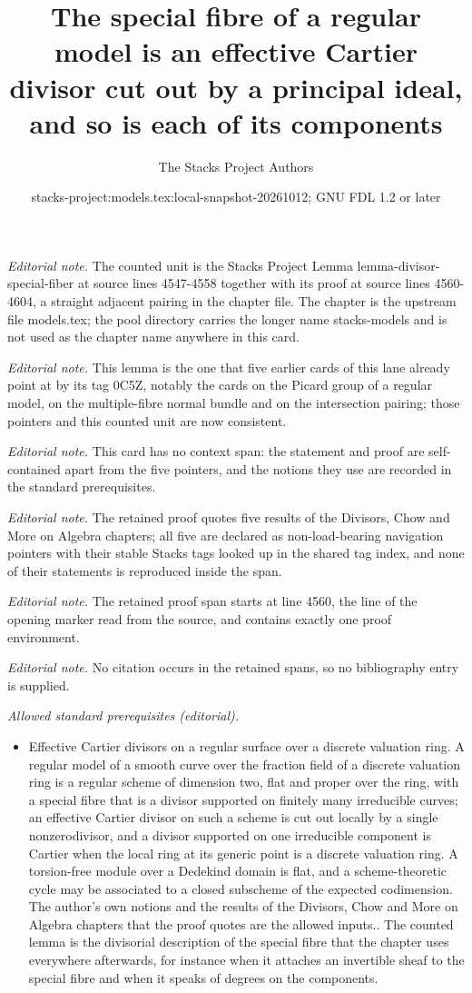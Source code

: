 \documentclass[10pt,a4paper]{amsart}
\title{The special fibre of a regular model is an effective Cartier divisor cut out by a principal ideal, and so is each of its components}
\author{The Stacks Project Authors}
\date{stacks-project:models.tex:local-snapshot-20261012; GNU FDL 1.2 or later}
\theoremstyle{plain}
\theoremstyle{definition}
\theoremstyle{remark}
\numberwithin{equation}{subsection}
\begin{document}
\maketitle
\noindent\textit{Editorial note.} The counted unit is the Stacks Project Lemma lemma-divisor-special-fiber at source lines 4547-4558 together with its proof at source lines 4560-4604, a straight adjacent pairing in the chapter file. The chapter is the upstream file models.tex; the pool directory carries the longer name stacks-models and is not used as the chapter name anywhere in this card.\par\medskip
\noindent\textit{Editorial note.} This lemma is the one that five earlier cards of this lane already point at by its tag 0C5Z, notably the cards on the Picard group of a regular model, on the multiple-fibre normal bundle and on the intersection pairing; those pointers and this counted unit are now consistent.\par\medskip
\noindent\textit{Editorial note.} This card has no context span: the statement and proof are self-contained apart from the five pointers, and the notions they use are recorded in the standard prerequisites.\par\medskip
\noindent\textit{Editorial note.} The retained proof quotes five results of the Divisors, Chow and More on Algebra chapters; all five are declared as non-load-bearing navigation pointers with their stable Stacks tags looked up in the shared tag index, and none of their statements is reproduced inside the span.\par\medskip
\noindent\textit{Editorial note.} The retained proof span starts at line 4560, the line of the opening marker read from the source, and contains exactly one proof environment.\par\medskip
\noindent\textit{Editorial note.} No citation occurs in the retained spans, so no bibliography entry is supplied.\par\medskip
\noindent\textit{Allowed standard prerequisites (editorial).}\begin{itemize}
\item Effective Cartier divisors on a regular surface over a discrete valuation ring. A regular model of a smooth curve over the fraction field of a discrete valuation ring is a regular scheme of dimension two, flat and proper over the ring, with a special fibre that is a divisor supported on finitely many irreducible curves; an effective Cartier divisor on such a scheme is cut out locally by a single nonzerodivisor, and a divisor supported on one irreducible component is Cartier when the local ring at its generic point is a discrete valuation ring. A torsion-free module over a Dedekind domain is flat, and a scheme-theoretic cycle may be associated to a closed subscheme of the expected codimension. The author's own notions and the results of the Divisors, Chow and More on Algebra chapters that the proof quotes are the allowed inputs.. The counted lemma is the divisorial description of the special fibre that the chapter uses everywhere afterwards, for instance when it attaches an invertible sheaf to the special fibre and when it speaks of degrees on the components.
\end{itemize}\medskip
\end{document}
